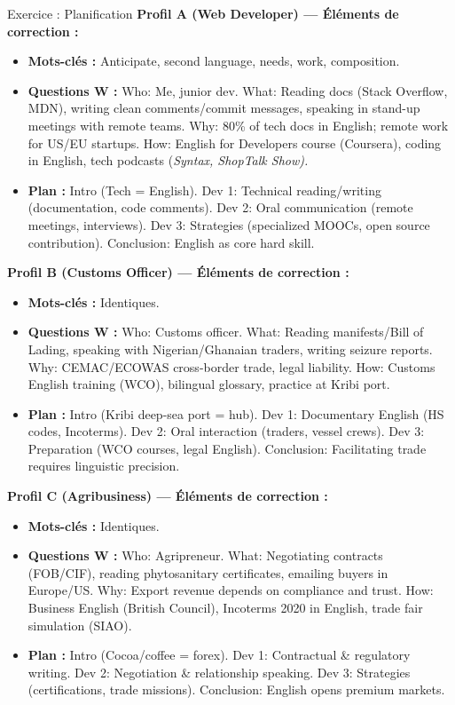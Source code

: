 \documentclass[11pt]{article}
\newcommand{\eng}[1]{\ifmmode\text{\textit{#1}}\else\begingroup\selectlanguage{english}\itshape #1\endgroup\fi}
\begin{document}
\begin{corrige}{Exercice : Planification}
\textbf{Profil A (Web Developer) — Éléments de correction :}
\begin{itemize}
    \item \textbf{Mots-clés :} Anticipate, second language, needs, work, composition.
    \item \textbf{Questions W :} Who: Me, junior dev. What: Reading docs (Stack Overflow, MDN), writing clean comments/commit messages, speaking in stand-up meetings with remote teams. Why: 80\% of tech docs in English; remote work for US/EU startups. How: English for Developers course (Coursera), coding in English, tech podcasts (\eng{Syntax}, \eng{ShopTalk Show}).
    \item \textbf{Plan :} Intro (Tech = English). Dev 1: Technical reading/writing (documentation, code comments). Dev 2: Oral communication (remote meetings, interviews). Dev 3: Strategies (specialized MOOCs, open source contribution). Conclusion: English as core hard skill.
\end{itemize}
\textbf{Profil B (Customs Officer) — Éléments de correction :}
\begin{itemize}
    \item \textbf{Mots-clés :} Identiques.
    \item \textbf{Questions W :} Who: Customs officer. What: Reading manifests/Bill of Lading, speaking with Nigerian/Ghanaian traders, writing seizure reports. Why: CEMAC/ECOWAS cross-border trade, legal liability. How: Customs English training (WCO), bilingual glossary, practice at Kribi port.
    \item \textbf{Plan :} Intro (Kribi deep-sea port = hub). Dev 1: Documentary English (HS codes, Incoterms). Dev 2: Oral interaction (traders, vessel crews). Dev 3: Preparation (WCO courses, legal English). Conclusion: Facilitating trade requires linguistic precision.
\end{itemize}
\textbf{Profil C (Agribusiness) — Éléments de correction :}
\begin{itemize}
    \item \textbf{Mots-clés :} Identiques.
    \item \textbf{Questions W :} Who: Agripreneur. What: Negotiating contracts (FOB/CIF), reading phytosanitary certificates, emailing buyers in Europe/US. Why: Export revenue depends on compliance and trust. How: Business English (British Council), Incoterms 2020 in English, trade fair simulation (SIAO).
    \item \textbf{Plan :} Intro (Cocoa/coffee = forex). Dev 1: Contractual \& regulatory writing. Dev 2: Negotiation \& relationship speaking. Dev 3: Strategies (certifications, trade missions). Conclusion: English opens premium markets.
\end{itemize}
\end{corrige}
\end{document}

